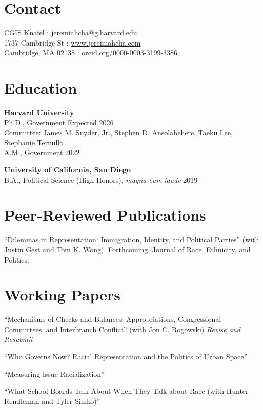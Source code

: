 \documentclass[margin, line]{res}
\begin{document}
\begin{resume}

\section{Contact}
CGIS Knafel \hfill \Letter: \href{mailto:jeremiahcha@g.harvard.edu}{jeremiahcha@g.harvard.edu}\\
1737 Cambridge St \hfill \Mundus: \href{httsp://www.jeremiahcha.com}{www.jeremiahcha.com}\\
Cambridge, MA 02138 \hfill \Mundus: \href{https://orcid.org/0000-0003-3199-3386}{orcid.org/0000-0003-3199-3386}

\section{Education}
\textbf{Harvard University}\\
\hspace*{5mm} Ph.D., Government \hfill Expected 2026\\
\hspace*{10mm} {\footnotesize Committee: James M. Snyder, Jr., Stephen D. Ansolabehere, Taeku Lee, Stephanie Ternullo}\\
\hspace*{5mm} A.M., Government \hfill 2022

\textbf{University of California, San Diego}\\
\hspace*{5mm} B.A., Political Science (High Honors), \textit{magna cum laude} \hfill 2019

\section{Peer-Reviewed Publications}
\begin{etaremune}
	\item ``Dilemmas in Representation: Immigration, Identity, and Political Parties'' (with Justin Gest and Tom K. Wong). Forthcoming. Journal of Race, Ethnicity, and Politics. 
\end{etaremune}



\section{Working Papers}
\begin{etaremune}
	\item ``Mechanisms of Checks and Balances: Appropriations, Congressional Committees, and Interbranch Conflict'' (with Jon C. Rogowski) \hfill \textit{Revise and Resubmit}
	\item ``Who Governs Now? Racial Representation and the Politics of Urban Space''
	\item ``Measuring Issue Racialization''
	\item ``What School Boards Talk About When They Talk about Race (with Hunter Rendleman and Tyler Simko)'' 
\end{etaremune}


\end{resume}
\end{document}
